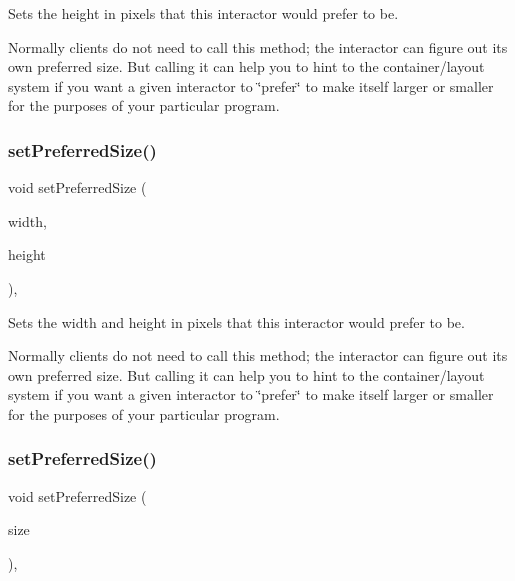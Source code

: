Sets the height in pixels that this interactor would prefer to be. 

Normally clients do not need to call this method; the interactor can figure out its own preferred size. But calling it can help you to hint to the container/layout system if you want a given interactor to \char`\"{}prefer\char`\"{} to make itself larger or smaller for the purposes of your particular program. \mbox{\label{classGInteractor_a042c5ae19430d765ef552371cae3632c}} 
\subsubsection{\texorpdfstring{set\+Preferred\+Size()}{setPreferredSize()}\hspace{0.1cm}{\footnotesize\ttfamily [1/2]}}
{\footnotesize\ttfamily void set\+Preferred\+Size (\begin{DoxyParamCaption}\item[{double}]{width,  }\item[{double}]{height }\end{DoxyParamCaption})\hspace{0.3cm}{\ttfamily [virtual]}, {\ttfamily [inherited]}}



Sets the width and height in pixels that this interactor would prefer to be. 

Normally clients do not need to call this method; the interactor can figure out its own preferred size. But calling it can help you to hint to the container/layout system if you want a given interactor to \char`\"{}prefer\char`\"{} to make itself larger or smaller for the purposes of your particular program. \mbox{\label{classGInteractor_aa22d9be4bc0e078bb0ea69b0fc9d7c75}} 
\subsubsection{\texorpdfstring{set\+Preferred\+Size()}{setPreferredSize()}\hspace{0.1cm}{\footnotesize\ttfamily [2/2]}}
{\footnotesize\ttfamily void set\+Preferred\+Size (\begin{DoxyParamCaption}\item[{const \mbox{\hyperlink{classGDimension}{G\+Dimension}} \&}]{size }\end{DoxyParamCaption})\hspace{0.3cm}{\ttfamily [virtual]}, {\ttfamily [inherited]}}



